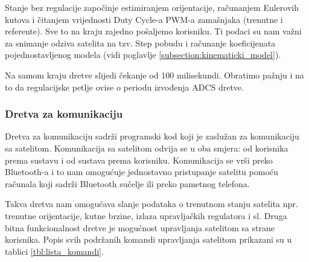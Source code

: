 \documentclass[times, utf8, diplomski, numeric]{templates/template}
\begin{document}
{{{{                Stanje bez regulacije započinje estimiranjem orijentacije, računanjem Eulerovih kutova i čitanjem vrijednosti Duty Cycle-a PWM-a zamašnjaka (trenutne i referente). Sve to na kraju zajedno pošaljemo korisniku. Ti podaci su nam važni za snimanje odziva satelita na tzv. Step pobudu i računanje koeficijenata pojednostavljenog modela (vidi poglavlje \ref{subsection:kinematicki_model}).

                Na samom kraju dretve slijedi čekanje od 100 milisekundi. Obratimo pažnju i na to da regulacijske petlje ovise o periodu izvođenja ADCS dretve.
            }

            \subsubsection{Dretva za komunikaciju}{
                Dretva za komunikaciju sadrži programski kod koji je zaslužan za komunikaciju sa satelitom. Komunikacija sa satelitom odvija se u oba smjera: od korisnika prema sustavu i od sustava prema korisniku. Komunikacija se vrši preko Bluetooth-a i to nam omogućuje jednostavno pristupanje satelitu pomoću računala koji sadrži Bluetooth sučelje ili preko pametnog telefona.

                Takva dretva nam omogućava slanje podataka o trenutnom stanju satelita npr. trenutne orijentacije, kutne brzine, izlaza upravljačkih regulatora i sl. Druga bitna funkcionalnost dretve je mogućnost upravljanja satelitom sa strane korisnika. Popis svih podržanih komandi upravljanja satelitom prikazani su u tablici \ref{tbl:lista_komandi}.

}}}}
\end{document}
